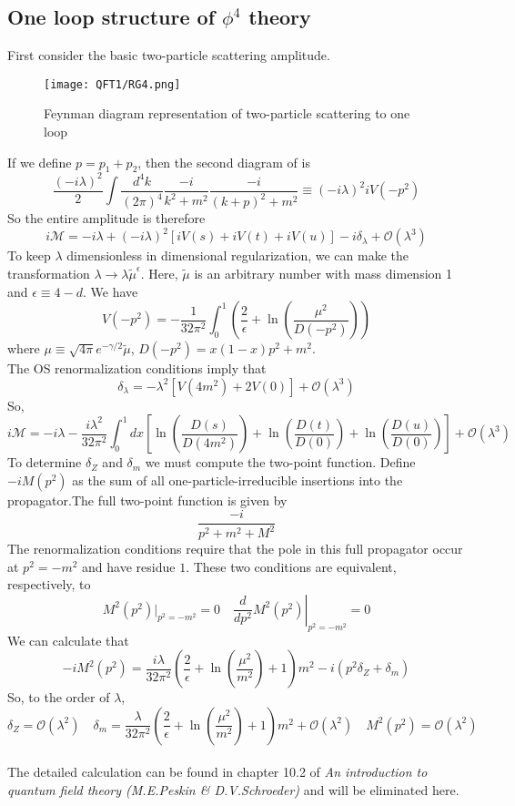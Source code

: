 \subsection{One loop structure of $\phi^4$ theory}
First consider the basic two-particle scattering amplitude.
\begin{figure}[!h]
\centering
\texttt{[image: QFT1/RG4.png]}
\caption{Feynman diagram representation of two-particle scattering to one loop}
\end{figure}
If we define $p = p_1 + p_2$, then the second diagram of is
\[\frac{(-i\lambda)^2}{2} \int \frac{d^4k}{(2\pi)^4} \frac{-i}{k^2+m^2} \frac{-i}{(k+p)^2+m^2} \equiv (-i\lambda)^2 iV(-p^2)\]
So the entire amplitude is therefore
\[i\mathcal{M} = -i\lambda + (-i\lambda)^2 [iV(s) + iV(t) + iV(u)] -i\delta_{\lambda} + \mathcal{O}(\lambda^3)\] 
To keep $\lambda$ dimensionless in dimensional regularization, we can make the transformation $\lambda \to \lambda \tilde{\mu}^{\epsilon}$. Here, $\tilde{\mu}$ is an arbitrary number with mass dimension 1 and $\epsilon \equiv 4-d$. We have
\[V(-p^2) = -\frac{1}{32\pi^2} \int_0^1 (\frac{2}{\epsilon} + \ln(\frac{\mu^2}{D(-p^2)}))\]
where $\mu \equiv  \sqrt{4\pi} e^{-\gamma/2} \tilde{\mu}$, $D(-p^2) = x(1-x)p^2+m^2$.
\\
The OS renormalization conditions imply that
\[\delta_{\lambda} = -\lambda^2[V(4m^2)+2V(0)] + \mathcal{O}(\lambda^3)\]
So,
\[i\mathcal{M} = -i\lambda -\frac{i\lambda^2}{32\pi^2} \int_0^1 dx \left[\ln(\frac{D(s)}{D(4m^2)}) +\ln(\frac{D(t)}{D(0)})+\ln(\frac{D(u)}{D(0)})\right] + \mathcal{O}(\lambda^3)\]
To determine $\delta_Z$ and $\delta_m$ we must compute the two-point function. Define $-iM(p^2)$ as the sum of all one-particle-irreducible insertions into the propagator.The full two-point function is given by
\[\frac{-i}{p^2 + m^2 + M^2}\]
The renormalization conditions require that the pole in this full propagator occur at $p^2=-m^2$ and have residue $1$. These two conditions are equivalent, respectively, to
\[M^2(p^2)|_{p^2=-m^2} = 0 \quad \left. \frac{d}{dp^2} M^2(p^2)\right|_{p^2=-m^2} =0\]
We can calculate that
\[-iM^2(p^2) = \frac{i\lambda}{32\pi^2}(\frac{2}{\epsilon} + \ln(\frac{\mu^2}{m^2})+1)m^2 -i(p^2\delta_Z + \delta_m)\]
So, to the order of $\lambda$, 
\[\delta_Z=\mathcal{O}(\lambda^2) \quad \delta_m = \frac{\lambda}{32\pi^2}(\frac{2}{\epsilon} + \ln(\frac{\mu^2}{m^2})+1)m^2 + \mathcal{O}(\lambda^2) \quad M^2(p^2) =\mathcal{O}(\lambda^2)\]
\\
The detailed calculation can be found in chapter 10.2 of \emph{An introduction to quantum field theory (M.E.Peskin \& D.V.Schroeder)} and will be eliminated here.

